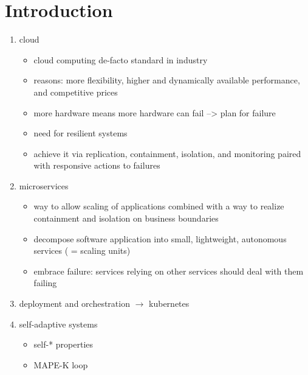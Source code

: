 
\section{Introduction}\label{sec:introduction}
  \begin{enumerate}
    \item cloud
      \begin{itemize}
        \item cloud computing de-facto standard in industry
        \item reasons: more flexibility, higher and dynamically available performance, and competitive prices~\cite{ToffettiMicroservices}
        \item more hardware means more hardware can fail --> plan for failure~\cite{microservices}
        \item need for resilient systems~\cite{reactivemanifesto}
        \item achieve it via replication, containment, isolation, and monitoring paired with responsive actions to failures
      \end{itemize}

    \item microservices
      \begin{itemize}
        \item way to allow scaling of applications combined with a way to realize containment and isolation on business boundaries
        \item decompose software application into small, lightweight, autonomous services ( = scaling units)
        \item embrace failure: services relying on other services should deal with them failing~\cite{microservices}
      \end{itemize}

    \item deployment and orchestration $\rightarrow$ \gls{kubernetes}

    \item self-adaptive systems
      \begin{itemize}
        \item self-* properties
        \item MAPE-K loop
      \end{itemize}


\end{enumerate}
